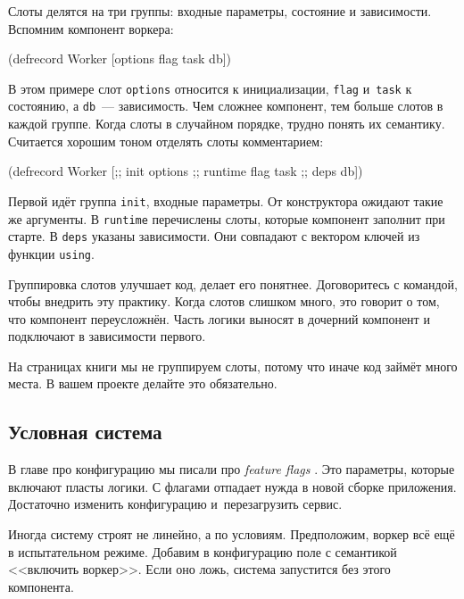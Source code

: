 Слоты делятся на три группы: входные параметры, состояние и
зависимости. Вспомним компонент воркера:

\begin{english}
  \begin{clojure}
(defrecord Worker
    [options flag task db])
  \end{clojure}
\end{english}

В этом примере слот \verb|options| относится к инициализации, \verb|flag|
и~\verb|task| к состоянию, а \verb|db|~--- зависимость. Чем сложнее компонент,
тем больше слотов в каждой группе. Когда слоты в случайном порядке, трудно понять
их семантику. Считается хорошим тоном отделять слоты комментарием:

\begin{english}
  \begin{clojure}
(defrecord Worker
    [;; init
     options
     ;; runtime
     flag
     task
     ;; deps
     db])
  \end{clojure}
\end{english}

Первой идёт группа \verb|init|, входные параметры. От конструктора ожидают
такие же аргументы. В \verb|runtime| перечислены слоты, которые компонент
заполнит при старте. В \verb|deps| указаны зависимости. Они совпадают с
вектором ключей из функции \verb|using|.

Группировка слотов улучшает код, делает его понятнее. Договоритесь с командой,
чтобы внедрить эту практику. Когда слотов слишком много, это говорит о том, что
компонент переусложнён. Часть логики выносят в дочерний компонент и подключают в
зависимости первого.

На страницах книги мы не группируем слоты, потому что иначе код займёт много
места. В вашем проекте делайте это обязательно.

\subsection{Условная система}


В главе про конфигурацию мы писали про \emph{feature flags} .
Это параметры, которые включают пласты логики. С флагами отпадает нужда в новой сборке
приложения. Достаточно изменить конфигурацию и~перезагрузить сервис.

Иногда систему строят не линейно, а по условиям. Предположим, воркер
всё ещё в испытательном режиме. Добавим в конфигурацию поле с семантикой
<<включить воркер>>. Если оно ложь, система запустится без этого компонента.

